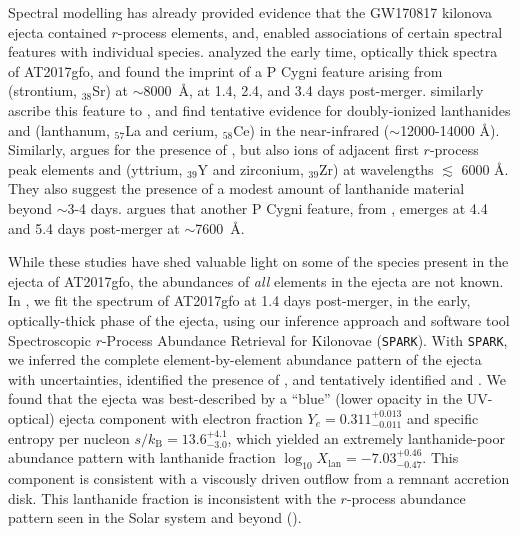 \documentclass[twocolumn,twocolappendix]{aastex63}
\def\SPARK{\texttt{SPARK}}
\begin{document}
Spectral modelling has already provided evidence that the GW170817 kilonova ejecta contained $r$-process elements, and, enabled associations of certain spectral features with individual species. \cite{watson19} analyzed the early time, optically thick spectra of AT2017gfo, and found the imprint of a P Cygni feature arising from  (strontium, ${}_{38}$Sr) at $\sim$8000~\AA, at 1.4, 2.4, and 3.4 days post-merger. \cite{domoto21, domoto22} similarly ascribe this feature to , and find tentative evidence for doubly-ionized lanthanides  and  (lanthanum, ${}_{57}$La and cerium, ${}_{58}$Ce) in the near-infrared ($\sim$12000-14000 \AA). Similarly, \cite{gillanders22} argues for the presence of , but also ions of adjacent first $r$-process peak elements  and  (yttrium, ${}_{39}$Y and zirconium, ${}_{39}$Zr) at wavelengths $\lesssim$ 6000 \AA. They also suggest the presence of a modest amount of lanthanide material beyond $\sim$3-4 days. \cite{sneppenwatson23} argues that another P Cygni feature, from , emerges at 4.4 and 5.4 days post-merger at $\sim$7600~\AA.

While these studies have shed valuable light on some of the species present in the ejecta of AT2017gfo, the abundances of \textit{all} elements in the ejecta are not known. In \cite{vieira23}, we fit the spectrum of AT2017gfo at 1.4 days post-merger, in the early, optically-thick phase of the ejecta, using our inference approach and software tool Spectroscopic $r$-Process Abundance Retrieval for Kilonovae (\SPARK). With \SPARK, we inferred the complete element-by-element abundance pattern of the ejecta with uncertainties, identified the presence of , and tentatively identified  and . We found that the ejecta was best-described by a ``blue'' (lower opacity in the UV-optical) ejecta component with electron fraction $Y_e = 0.311^{+0.013}_{-0.011}$ and specific entropy per nucleon $s / k_{\mathrm{B}} = 13.6^{+4.1}_{-3.0}$, which yielded an extremely lanthanide-poor abundance pattern with lanthanide fraction $\log_{10} X_{\mathrm{lan}} = {-7.03}^{+0.46}_{-0.47}$. This component is consistent with a viscously driven outflow from a remnant accretion disk. This lanthanide fraction is inconsistent with the $r$-process abundance pattern seen in the Solar system and beyond (\citealt{ji19}). 
\end{document}

